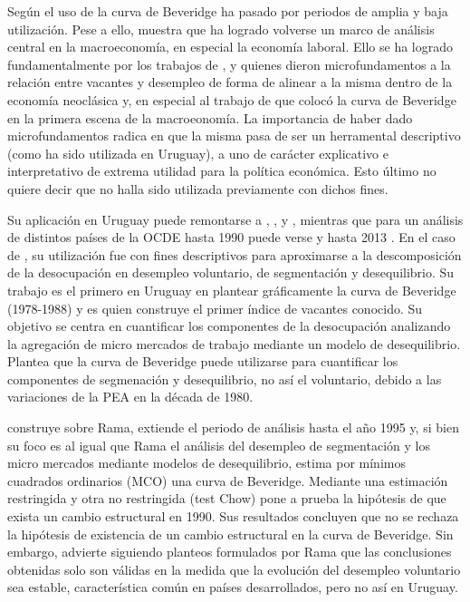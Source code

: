 Según \cite{Rodenburg2007} el uso de la curva de Beveridge ha pasado por periodos de amplia y baja utilización. Pese a ello, \cite{Elsby2015} muestra que ha logrado volverse un marco de análisis central en la macroeconomía, en especial la economía laboral. Ello se ha logrado fundamentalmente por los trabajos de \cite{Pissarides1985}, \cite{Mortensen1994} y \cite{Diamond1982} quienes dieron microfundamentos a la relación entre vacantes y desempleo de forma de alinear a la misma dentro de la economía neoclásica y, en especial al trabajo de \cite{Blanchard1989} que colocó la curva de Beveridge en la primera escena de la macroeonomía. La importancia de haber dado microfundamentos radica en que la misma pasa de ser un herramental descriptivo (como ha sido utilizada en Uruguay), a uno  de carácter explicativo e interpretativo de extrema utilidad para la política económica. Esto último no quiere decir que no halla sido utilizada previamente con dichos fines. 

Su aplicación en Uruguay puede remontarse a \cite{Rama1988}, \cite{DECON1993}, \cite{Urrestarazu1997} y \cite{Alma2011}, mientras que para un análisis de distintos países de la OCDE hasta 1990 puede verse \cite{Nickell2002} y hasta 2013 \cite{Hobijn2013}. En el caso de \cite{Rama1988}, su utilización fue con fines descriptivos para aproximarse a la descomposición de la desocupación en desempleo voluntario, de segmentación y desequilibrio. Su trabajo es el primero en Uruguay en plantear gráficamente la curva de Beveridge (1978-1988) y es quien construye el primer índice de vacantes conocido. Su objetivo se centra en cuantificar los componentes de la desocupación analizando la agregación de micro mercados de trabajo mediante un modelo de desequilibrio. Plantea que la curva de Beveridge puede utilizarse para cuantificar los componentes de segmenación y desequilibrio, no así el voluntario, debido a las variaciones de la PEA en la década de 1980.

\cite{Urrestarazu1997} construye sobre Rama, extiende el periodo de análisis hasta el año 1995 y, si bien su foco es al igual que Rama el análisis del desempleo de segmentación y los micro mercados mediante modelos de desequilibrio, estima por mínimos cuadrados ordinarios (MCO) una curva de Beveridge. Mediante una estimación restringida y otra no restringida (test Chow) pone a prueba la hipótesis de que exista un cambio estructural en 1990. Sus resultados concluyen que no se rechaza la hipótesis de existencia de un cambio estructural en la curva de Beveridge. Sin embargo, advierte siguiendo planteos formulados por Rama que las conclusiones obtenidas solo son válidas en la medida que la evolución del desempleo voluntario sea estable, característica común en países desarrollados, pero no así en Uruguay. 

